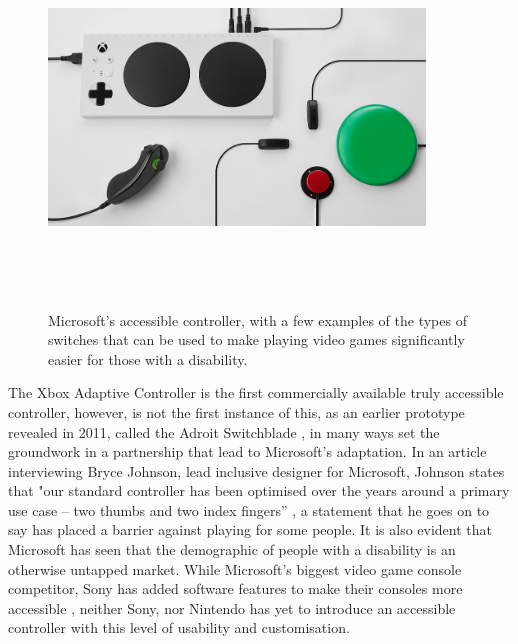\begin{figure} [h]
    \centering
    \includegraphics[width=10cm,height=10cm,keepaspectratio]{Figures/accessible_controller.png}
    \caption{Microsoft's accessible controller, with a few examples of the types of switches that can be used to make playing video games significantly easier for those with a disability.}
    \label{fig:Jellybean}
\end{figure}

The Xbox Adaptive Controller is the first commercially available truly accessible controller, however, is not the first instance of this, as an earlier prototype revealed in 2011, called the Adroit Switchblade \cite{ablegamer}, in many ways set the groundwork in a partnership that lead to Microsoft's adaptation.
In an article interviewing Bryce Johnson, lead inclusive designer for Microsoft, Johnson states that "our standard controller has been optimised over the years around a primary use case – two thumbs and two index fingers” \cite{disabilitygaming}, a statement that he goes on to say has placed a barrier against playing for some people.
It is also evident that Microsoft has seen that the demographic of people with a disability is an otherwise untapped market.
While Microsoft's biggest video game console competitor, Sony has added software features to make their consoles more accessible \cite{sony}, neither Sony, nor Nintendo has yet to introduce an accessible controller with this level of usability and customisation.


